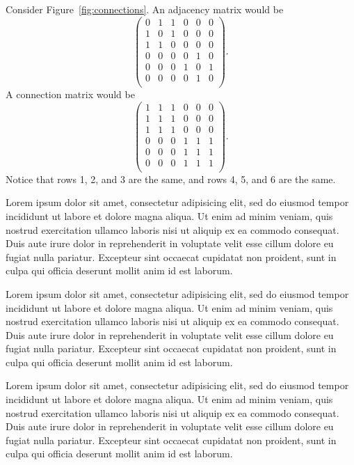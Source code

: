\documentclass[10pt]{acmsiggraph}               %
\begin{document}
Consider Figure~\ref{fig:connections}. 
An adjacency matrix would be
$$
\left(
\begin{array}{cccccc}
0&1&1&0&0&0\\
1&0&1&0&0&0\\
1&1&0&0&0&0\\
0&0&0&0&1&0\\
0&0&0&1&0&1\\
0&0&0&0&1&0\\
\end{array}
\right).
$$
A connection matrix would be
$$
\left(
\begin{array}{cccccc}
1&1&1&0&0&0\\
1&1&1&0&0&0\\
1&1&1&0&0&0\\
0&0&0&1&1&1\\
0&0&0&1&1&1\\
0&0&0&1&1&1\\
\end{array}
\right).
$$
Notice that rows 1, 2, and 3 are the same, and rows 4, 5, and 6 are the same.



Lorem ipsum dolor sit amet, consectetur adipisicing elit, sed do eiusmod tempor incididunt ut labore et dolore magna aliqua. Ut enim ad minim veniam, quis nostrud exercitation ullamco laboris nisi ut aliquip ex ea commodo consequat. Duis aute irure dolor in reprehenderit in voluptate velit esse cillum dolore eu fugiat nulla pariatur. Excepteur sint occaecat cupidatat non proident, sunt in culpa qui officia deserunt mollit anim id est laborum.

Lorem ipsum dolor sit amet, consectetur adipisicing elit, sed do eiusmod tempor incididunt ut labore et dolore magna aliqua. Ut enim ad minim veniam, quis nostrud exercitation ullamco laboris nisi ut aliquip ex ea commodo consequat. Duis aute irure dolor in reprehenderit in voluptate velit esse cillum dolore eu fugiat nulla pariatur. Excepteur sint occaecat cupidatat non proident, sunt in culpa qui officia deserunt mollit anim id est laborum.

Lorem ipsum dolor sit amet, consectetur adipisicing elit, sed do eiusmod tempor incididunt ut labore et dolore magna aliqua. Ut enim ad minim veniam, quis nostrud exercitation ullamco laboris nisi ut aliquip ex ea commodo consequat. Duis aute irure dolor in reprehenderit in voluptate velit esse cillum dolore eu fugiat nulla pariatur. Excepteur sint occaecat cupidatat non proident, sunt in culpa qui officia deserunt mollit anim id est laborum.
\end{document}
